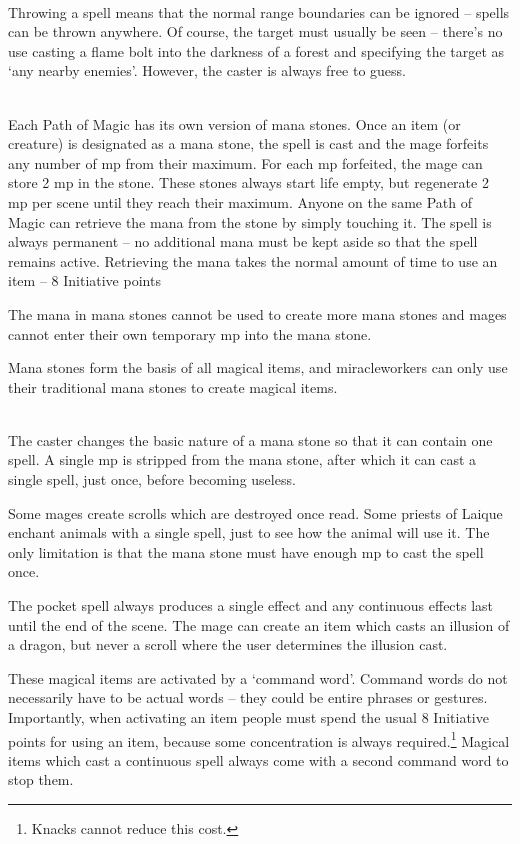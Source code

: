 \documentclass[titlepage,a4paper,openany]{book}
\begin{document}
\begin{multicols}{2}
\\
Throwing a spell means that the normal range boundaries can be ignored -- spells can be thrown anywhere. Of course, the target must usually be seen -- there's no use casting a flame bolt into the darkness of a forest and specifying the target as `any nearby enemies'.  However, the caster is always free to guess.

\\
Each Path of Magic has its own version of mana stones. Once an item (or creature) is designated as a mana stone, the spell is cast and the mage forfeits any number of \gls{mp} from their maximum. For each \gls{mp} forfeited, the mage can store 2 \gls{mp} in the stone. These stones always start life empty, but regenerate 2 \gls{mp} per scene until they reach their maximum. Anyone on the same Path of Magic can retrieve the mana from the stone by simply touching it. The spell is always permanent -- no additional mana must be kept aside so that the spell remains active. Retrieving the mana takes the normal amount of time to use an item -- 8 Initiative points

The mana in mana stones cannot be used to create more mana stones and mages cannot enter their own temporary \gls{mp} into the mana stone.

Mana stones form the basis of all magical items, and \glspl{miracleworker} can only use their traditional mana stones to create magical items.

\spelllevel

\\
The caster changes the basic nature of a mana stone so that it can contain one spell.  A single \gls{mp} is stripped from the mana stone, after which it can cast a single spell, just once, before becoming useless.

Some mages create scrolls which are destroyed once read.  Some priests of Laique enchant animals with a single spell, just to see how the animal will use it.  The only limitation is that the mana stone must have enough \gls{mp} to cast the spell once.

The pocket spell always produces a single effect and any continuous effects last until the end of the scene.  The mage can create an item which casts an illusion of a dragon, but never a scroll where the user determines the illusion cast.

These magical items are activated by a `command word'. Command words do not necessarily have to be actual words -- they could be entire phrases or gestures. Importantly, when activating an item people must spend the usual 8 Initiative points for using an item, because some concentration is always required.\footnote{Knacks cannot reduce this cost.} Magical items which cast a continuous spell always come with a second command word to stop them.


\end{multicols}
\end{document}
